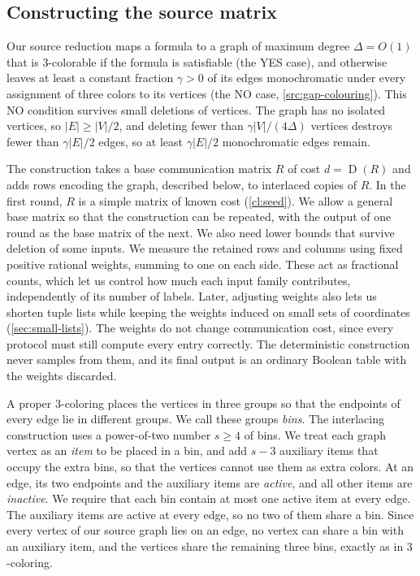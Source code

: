 \documentclass[11pt,letterpaper]{article} \usepackage[utf8]{inputenc}
\theoremstyle{plain} \newtheorem{theorem}{Theorem}[section]
\theoremstyle{definition} \newaliascnt{definition}{theorem}
\newcommand{\D}{\operatorname{D}}
\begin{document}
\subsection{Constructing the source matrix}

Our source reduction maps a formula to a graph of maximum degree
$\Delta=O(1)$ that is $3$-colorable if the formula is satisfiable (the
YES case), and otherwise leaves at least a constant fraction $\gamma>0$ of
its edges monochromatic under every assignment of three colors to its
vertices (the NO case, \cref{src:gap-colouring}). This NO condition survives
small deletions of vertices. The graph has no isolated vertices, so
$|E|\ge|V|/2$, and deleting fewer than $\gamma|V|/(4\Delta)$
vertices destroys fewer than $\gamma|E|/2$ edges, so at least
$\gamma|E|/2$ monochromatic edges remain.

The construction takes a base communication matrix $R$ of cost $d=\D(R)$
and adds rows encoding the graph, described below, to interlaced copies of
$R$. In the first round, $R$ is a simple matrix of known cost (\cref{cl:seed}). We
allow a general base matrix so that the construction can be repeated, with
the output of one round as the base matrix of the next. We also need lower bounds
that survive deletion of some inputs. We measure the retained rows and columns
using fixed positive rational weights, summing to one on each side. These act
as fractional counts, which let us control how much each input family contributes,
independently of its number of labels. Later, adjusting
weights also lets us shorten tuple lists while keeping the weights induced on
small sets of coordinates (\cref{sec:small-lists}).
The weights do not change communication cost, since every protocol must still compute
every entry correctly. The deterministic construction never samples from them,
and its final output is an ordinary Boolean table with the weights discarded.

A proper $3$-coloring places the vertices in
three groups so that the endpoints of every edge lie in different groups. We call
these groups \emph{bins}. The interlacing construction uses a power-of-two
number $s\ge4$ of bins. We treat each graph vertex as an \emph{item} to be
placed in a bin, and add $s-3$ auxiliary items that occupy the extra bins,
so that the vertices cannot use them as extra colors. At an edge, its two
endpoints and the auxiliary items are \emph{active}, and all other items
are \emph{inactive}. We require that each bin contain at most one active
item at every edge. The auxiliary items are active at every edge, so no two
of them share a bin. Since every vertex of our source graph
lies on an edge, no vertex can share a bin with an auxiliary item, and the
vertices share the remaining three bins, exactly as in $3$-coloring.
\end{document}
